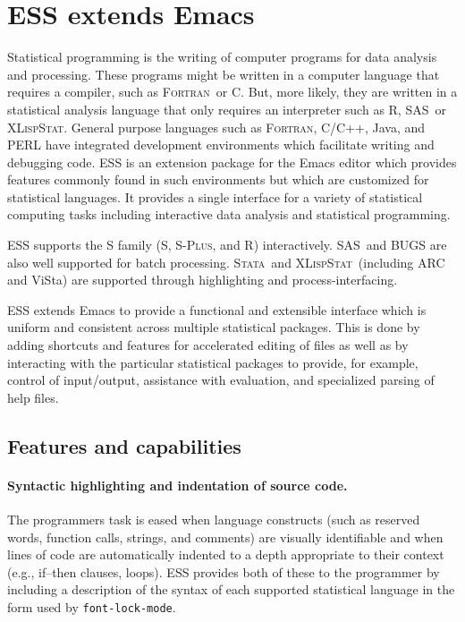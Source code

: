 \documentclass{article}
\newcommand*{\SAS}{\textsc{SAS}}
\newcommand*{\Splus}{\textsc{S-Plus}}
\newcommand*{\XLispStat}{\textsc{XLispStat}}
\newcommand*{\Stata}{\textsc{Stata}}
\newcommand*{\Fortran}{\textsc{Fortran}}
\newcommand{\stexttt}[1]{{\small\texttt{#1}}}
\begin{document}
\section{ESS extends Emacs}
\label{sec:ess-extends-emacs}

Statistical programming is the writing of computer programs for data
analysis and processing.  These programs might be written in a
computer language that requires a compiler, such as \Fortran\ or C.
But, more likely, they are written in a statistical analysis language
that only requires an interpreter such as R, \SAS\ or \XLispStat.
General purpose languages such as \Fortran, C/C++, Java, and PERL
have integrated development environments which facilitate writing and
debugging code.  ESS is an extension package for the Emacs editor
which provides features commonly found in such environments but which
are customized for statistical languages.  It provides a single
interface for a variety of statistical computing tasks including
interactive data analysis and statistical programming.

ESS supports the S family (S, \Splus, and R) interactively.  \SAS\ and
BUGS are also well supported for batch processing.  \Stata\ and
\XLispStat\ (including ARC and ViSta) are supported through
highlighting and process-interfacing.

ESS extends Emacs to provide a functional and extensible interface
which is uniform and consistent across multiple statistical packages.
This is done by adding shortcuts and features for accelerated editing
of files as well as by interacting with the particular statistical
packages to provide, for example, control of input/output, assistance
with evaluation, and specialized parsing of help files.

\subsection{Features and capabilities}
\label{sec:ESS:features}

\paragraph{Syntactic highlighting and indentation of source code.}
The programmers task is eased when language constructs (such as
reserved words, function calls, strings, and comments) are visually
identifiable and when lines of code are automatically indented to a
depth appropriate to their context (e.g., if--then clauses, loops).
ESS provides both of these to the programmer by including a
description of the syntax of each supported statistical language in
the form used by \stexttt{font-lock-mode}.
\end{document}
